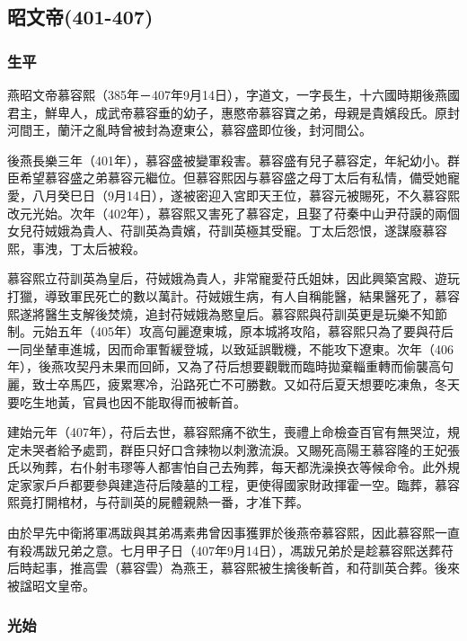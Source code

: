
\subsection{昭文帝\tiny(401-407)}

\subsubsection{生平}

燕昭文帝慕容熙（385年－407年9月14日），字道文，一字長生，十六國時期後燕國君主，鮮卑人，成武帝慕容垂的幼子，惠愍帝慕容寶之弟，母親是貴嬪段氏。原封河間王，蘭汗之亂時曾被封為遼東公，慕容盛即位後，封河間公。

後燕長樂三年（401年），慕容盛被變軍殺害。慕容盛有兒子慕容定，年紀幼小。群臣希望慕容盛之弟慕容元繼位。但慕容熙因与慕容盛之母丁太后有私情，備受她寵愛，八月癸巳日（9月14日），遂被密迎入宮即天王位，慕容元被賜死，不久慕容熙改元光始。次年（402年），慕容熙又害死了慕容定，且娶了苻秦中山尹苻謨的兩個女兒苻娀娥為貴人、苻訓英為貴嬪，苻訓英極其受寵。丁太后怨恨，遂謀廢慕容熙，事洩，丁太后被殺。

慕容熙立苻訓英為皇后，苻娀娥為貴人，非常寵愛苻氏姐妹，因此興築宮殿、遊玩打獵，導致軍民死亡的數以萬計。苻娀娥生病，有人自稱能醫，結果醫死了，慕容熙遂將醫生支解後焚燒，追封苻娀娥為愍皇后。慕容熙與苻訓英更是玩樂不知節制。元始五年（405年）攻高句麗遼東城，原本城將攻陷，慕容熙只為了要與苻后一同坐輦車進城，因而命軍暫緩登城，以致延誤戰機，不能攻下遼東。次年（406年），後燕攻契丹未果而回師，又為了苻后想要觀戰而臨時拋棄輜重轉而偷襲高句麗，致士卒馬匹，疲累寒冷，沿路死亡不可勝數。又如苻后夏天想要吃凍魚，冬天要吃生地黃，官員也因不能取得而被斬首。

建始元年（407年），苻后去世，慕容熙痛不欲生，喪禮上命檢查百官有無哭泣，規定未哭者給予處罰，群臣只好口含辣物以刺激流淚。又賜死高陽王慕容隆的王妃張氏以殉葬，右仆射韦璆等人都害怕自己去殉葬，每天都洗澡换衣等候命令。此外規定家家戶戶都要參與建造苻后陵墓的工程，更使得國家財政揮霍一空。臨葬，慕容熙竟打開棺材，与苻訓英的屍體親熱一番，才准下葬。

由於早先中衛將軍馮跋與其弟馮素弗曾因事獲罪於後燕帝慕容熙，因此慕容熙一直有殺馮跋兄弟之意。七月甲子日（407年9月14日），馮跋兄弟於是趁慕容熙送葬苻后時起事，推高雲（慕容雲）為燕王，慕容熙被生擒後斬首，和苻訓英合葬。後來被諡昭文皇帝。

\subsubsection{光始}

